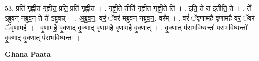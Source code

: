 \documentclass[17pt]{extarticle}
\begin{document}
53. प्रति॑ गृह्णीत गृह्णीत॒ प्रति॒ प्रति॑ गृह्णीत । . गृ॒ह्णी॒ते तीति॑ गृह्णीत गृह्णी॒ते ति॑ । . इति॒ ते त इतीति॒ ते । . ते᳚ ऽब्रुवन् नब्रुव॒न् ते ते᳚ ऽब्रुवन्न् । . अ॒ब्रु॒व॒न्॒. वरं॒ ॅवर॑ मब्रुवन् नब्रुव॒न्॒. वर᳚म् । . वरं॑ ॅवृणामहै वृणामहै॒ वरं॒ ॅवरं॑ ॅवृणामहै । . वृ॒णा॒म॒है॒ वृ॒क्णाद् वृ॒क्णाद् वृ॑णामहै वृणामहै वृ॒क्णात् । . वृ॒क्णात् प॑राभवि॒ष्यन्तः॑ पराभवि॒ष्यन्तो॑ वृ॒क्णाद् वृ॒क्णात् प॑राभवि॒ष्यन्तः॑ । \newline

\textbf{Ghana Paata } \newline
\end{document}
